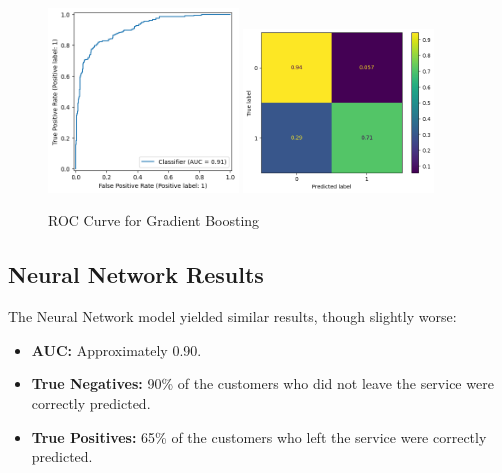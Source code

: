 \documentclass[12pt]{article}
\begin{document}
\begin{figure}[h!]
    \centering
    \includegraphics[width=0.45\textwidth]{figures/roc_curve_gb.png}
    \includegraphics[width=0.45\textwidth]{figures/confusion_matrix_gb.png}
    \caption{ROC Curve for Gradient Boosting}
    \label{fig:roc_curve_gb}
\end{figure}


\subsection{Neural Network Results}
The Neural Network model yielded similar results, though slightly worse:
\begin{itemize}
    \item \textbf{AUC:} Approximately 0.90.
    \item \textbf{True Negatives:} 90\% of the customers who did not leave the service were correctly predicted.
    \item \textbf{True Positives:} 65\% of the customers who left the service were correctly predicted.
\end{itemize}
\end{document}

